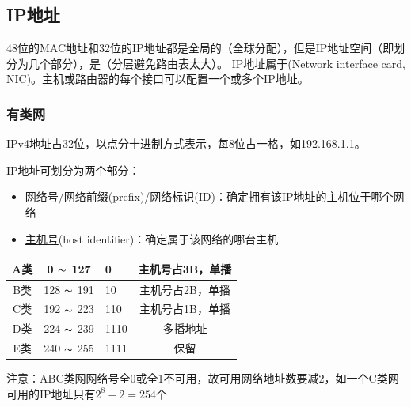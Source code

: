 \subsection{IP地址}
48位的MAC地址和32位的IP地址都是全局的（全球分配），但是IP地址空间（即划分为几个部分），是（分层避免路由表太大）。
IP地址属于(Network interface card, NIC)。主机或路由器的每个接口可以配置一个或多个IP地址。

\subsubsection{有类网}
IPv4地址占32位，以点分十进制方式表示，每8位占一格，如192.168.1.1。

IP地址可划分为两个部分：
\begin{itemize}
	\item \underline{网络号}/网络前缀(prefix)/网络标识(ID)：确定拥有该IP地址的主机位于哪个网络
	\item \underline{主机号}(host identifier)：确定属于该网络的哪台主机
\end{itemize}

\begin{center}
\begin{tabular}{|c|c|l|c|}\hline
A类 & 0 $\thicksim$ 127 & 0 & 主机号占3B，单播\\\hline
B类 & 128 $\thicksim$ 191 & 10 & 主机号占2B，单播\\\hline
C类 & 192 $\thicksim$ 223 & 110 & 主机号占1B，单播\\\hline
D类 & 224 $\thicksim$ 239 & 1110 & 多播地址\\\hline
E类 & 240 $\thicksim$ 255 & 1111 & 保留\\\hline
\end{tabular}
\end{center}
注意：ABC类网网络号全0或全1不可用，故可用网络地址数要减2，如一个C类网可用的IP地址只有$2^8-2=254$个

